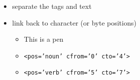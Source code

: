 \documentclass[a4paper,landscape,headrule,footrule,xetex]{foils}
\begin{document}












\begin{itemize}
\item separate the tags and text
\item link back to character (or byte positions)
  \begin{itemize}
  \item This is a pen
  \item \texttt{<pos='noun' cfrom='0'  cto='4'>}
  \item \texttt{<pos='verb' cfrom='5'  cto='7'>}
    
  \end{itemize}
\end{itemize}
\end{document}

